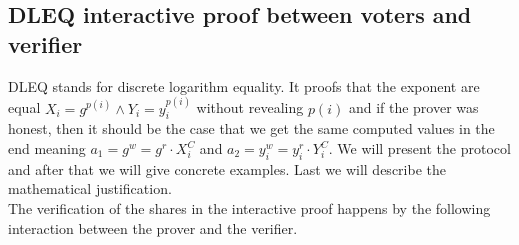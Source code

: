 \subsection{DLEQ interactive proof between voters and verifier} \label{proofs:dleq_voter_verifier}
DLEQ stands for discrete logarithm equality. It proofs that the exponent are equal \begin{math}X_i=g^{p(i)}  \land Y_i=y_i^{p(i)} \end{math} without revealing \begin{math}{p(i)} \end{math} and if the prover was honest, then it should be the case that we get the same computed values in the end meaning $a_1 = g^w= g^r \cdot X_i^C$ and $a_2= y_i^w = y_i^r \cdot Y_i^C$. We will present the protocol and after that we will give concrete examples. Last we will describe the mathematical justification.\\

\noindent
The verification of the shares in the interactive proof happens by the following  interaction between the prover and the verifier.



